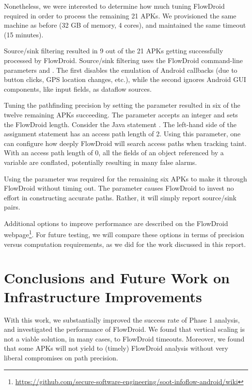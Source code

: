 Nonetheless, we were interested to determine how much tuning FlowDroid required in order to process the remaining 21 APKs.  We provisioned the same machine as before (32 GB of memory, 4 cores), and maintained the same timeout (15 minutes).  



Source/sink filtering resulted in 9 out of the 21 APKs getting successfully processed by FlowDroid. Source/sink filtering uses the FlowDroid command-line parameters  and . The first disables the emulation of Android callbacks (due to button clicks, GPS location changes, etc.), while the second ignores Android GUI components, like input fields, as dataflow sources.

Tuning the pathfinding precision by setting the  parameter resulted in six of the twelve remaining APKs succeeding. The  parameter accepts an integer and sets the FlowDroid  length. Consider the Java statement . The left-hand side of the assignment statement has an access path length of 2. Using this parameter, one can configure how deeply FlowDroid will search access paths when tracking taint. With an access path length of 0, all the fields of an object referenced by a variable are conflated, potentially resulting in many false alarms.

Using the  parameter was required for the remaining six APKs to make it through FlowDroid without timing out. The  parameter causes FlowDroid to invest no effort in constructing accurate paths. Rather, it will simply report source/sink pairs. 

Additional options to improve performance are described on the FlowDroid webpage\footnote{\url{https://github.com/secure-software-engineering/soot-infoflow-android/wiki}}. For future testing, we will compare these options in terms of precision versus computation requirements, as we did for the work discussed in this report.



\section{Conclusions and Future Work on Infrastructure Improvements}
With this work, we substantially improved the success rate of Phase 1 analysis, and investigated the performance of FlowDroid.  We found that vertical scaling is not a viable solution, in many cases, to FlowDroid timeouts.  Moreover, we found that some APKs will not yield to (timely) FlowDroid analysis without very liberal compromises on path precision.


